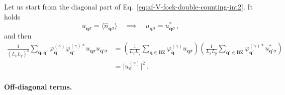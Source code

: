 \begin{tabproof}
	Let us start from the diagonal part of Eq.~\eqref{eq:af-V-fock-double-counting-int2}. It holds
	\[
	u_{\mathbf{q}\sigma} = \langle
	\hat n_{\mathbf{q}\sigma}
	\rangle
	\quad\implies\quad
	u_{\mathbf{q}\sigma} = u_{\mathbf{q}\sigma}^* \, ,
	\]
	and then
	\begin{align}
		\frac{1}{(L_x L_y)^2} \sum_{\mathbf{q}, \mathbf{q}'} \varphi_{\mathbf{q}}^{(\gamma)} \varphi_{\mathbf{q}'}^{(\gamma)*}
		u_{\mathbf{q}\sigma} u_{\mathbf{q}'\sigma} &=
		\left(
		\frac{1}{L_x L_y} \sum_{\mathbf{q}\in\mathrm{BZ}} \varphi_{\mathbf{q}}^{(\gamma)} u_{\mathbf{q}\sigma}
		\right) \left(
		\frac{1}{L_x L_y} \sum_{\mathbf{q}'\in\mathrm{BZ}} \varphi_{\mathbf{q}'}^{(\gamma)*} u_{\mathbf{q}'\sigma}^*
		\right) \nonumber \\
		&= \big|u^{(\gamma)}_\sigma\big|^2 \, . \label{eq:af-HV(diag)-fock-Ec}
	\end{align}
	
	\paragraph{Off-diagonal terms.}
	

\end{tabproof}
